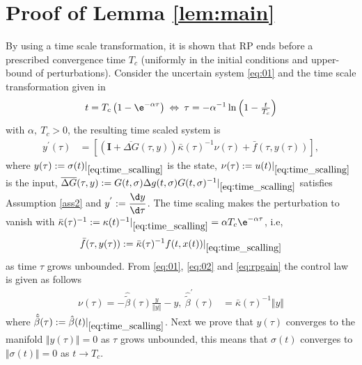\documentclass[twocolumn]{autart}    %
\begin{document}
\section{Proof of Lemma \ref{lem:main}}\label{app:proofmainlemma}\vspace{-10pt}
By using a time scale transformation,  it is shown that RP ends before a prescribed convergence time $T_c$ (uniformly in the initial conditions and upper-bound of perturbations).  Consider the uncertain system \eqref{eq:01} and the time scale transformation given in \cite{gomez2020}\vspace{-5pt}
\begin{equation}\label{eq:time_scalling}
 t=T_c\left(1-\e^{-\alpha \tau}\right) \: \Leftrightarrow \:\tau=-\alpha^{-1} \ln\left(1-\tfrac{t}{T_c}\right)
\end{equation} with $\alpha, \: T_c>0$, the resulting time scaled system is
\begin{equation}\label{eq:tssys}
\begin{aligned}
y^{'}(\tau)&=[(\mathbf{I}+\overline{\Delta G}(\tau,y))\bar{\kappa}(\tau)^{-1}\nu(\tau) +\bar{ f}(\tau,y(\tau))], 
\end{aligned}
\end{equation} where  $y(\tau):=\sigma(t)\vert_{\eqref{eq:time_scalling}}$ is the state,  $\nu(\tau):=u(t)\vert_{\eqref{eq:time_scalling}}$ is the input,  $\overline{\Delta G}(\tau,y):={G}(t,\sigma){\Delta g}(t,\sigma){G}(t,\sigma)^{-1}\vert_{\eqref{eq:time_scalling}}$ satisfies Assumption \ref{ass2} and $y^{'}:=\dfrac{\d y}{\d \tau}$. The time scaling makes the perturbation to vanish with $\bar{\kappa}(\tau)^{-1}:=\kappa(t)^{-1}\vert_{\eqref{eq:time_scalling}}=\alpha T_c \e^{-\alpha \tau}$, i.e,   
\begin{equation}\label{eq:vanishingpert}
\bar{f}(\tau,y(\tau)):=\bar{\kappa}(\tau)^{-1} f(t,x(t))\vert_{\eqref{eq:time_scalling}}
\end{equation} as time $\tau$ grows unbounded. From \eqref{eq:01},  \eqref{eq:02} and \eqref{eq:rpgain} the control law is given as follows
\begin{equation}\label{eq:tscontrol}
\begin{aligned} 
 \nu(\tau)=-\hat{\tilde{\beta}}(\tau)\tfrac{y}{\Vert y \Vert}-{y},\: \hat{\tilde{\beta}}^{'}(\tau)&=\bar{\kappa}(\tau)^{-1}\Vert {y} \Vert
\end{aligned}
\end{equation} where $\hat{\tilde{\beta}}(\tau):=\hat{\beta}(t)\vert_{\eqref{eq:time_scalling}}$.  
Next we prove that $y(\tau)$ converges to the manifold $\Vert y(\tau) \Vert=0$ as $\tau$ grows unbounded, this means that $\sigma(t)$ converges to $\Vert \sigma(t) \Vert=0$ as $t\rightarrow T_c$.
\end{document}
